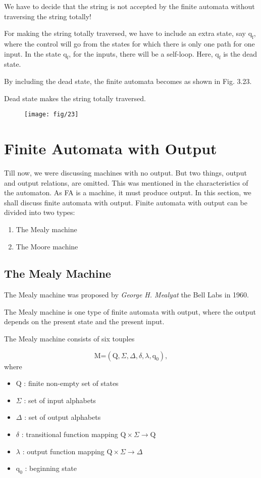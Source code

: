 \documentclass[12pt, a4paper]{article}
\begin{document}
We have to decide that the string is not accepted by the finite automata without traversing the string totally!

For making the string totally traversed, we have to 
include an extra state, say $\text{q}_\text{f}$, where the control will go from the states for which there is only one path for one input. In the state $\text{q}_\text{f}$, for the inputs, there will be a self-loop. Here, $\text{q}_\text{f}$ is the dead state.

By including the dead state, the finite automata becomes as shown in Fig. 3.23.

Dead state makes the string totally traversed.


\begin{figure}[H]
	\begin{center}
		\texttt{[image: fig/23]}
		\label{fig23}
	\end{center}
\end{figure}

\section{Finite Automata with Output}

Till now, we were discussing machines with no output. But two things, output and output relations, are omitted. This was mentioned in the characteristics of the automaton. As FA is a machine, it must produce output. In this section, we shall discuss finite automata with output. Finite automata with output can be divided into two types:
\begin{enumerate}
	\item The Mealy machine
	\item The Moore machine
\end{enumerate}

\subsection{The Mealy Machine}
The Mealy machine was proposed by \textit{George H. Mealyat} the Bell Labs in 1960.

The Mealy machine is one type of finite automata with output, where the output depends on the present state and the present input.

The Mealy machine consists of six touples

\[\text{M=} (\text{Q},\Sigma,\Delta,\delta,\lambda,\text{q}_\text{0} ),\]
where

\begin{itemize}
	\item Q : finite non-empty set of states
	\item $\Sigma$ : set of input alphabets
	\item $\Delta$ : set of output alphabets
	\item $\delta$ : transitional function mapping $\text{Q}\times \Sigma \rightarrow \text{Q}$
	\item $\lambda$ : output function mapping $\text{Q}\times \Sigma \rightarrow \Delta$
	\item $\text{q}_\text{0}$ : beginning state	
\end{itemize}
\end{document}
